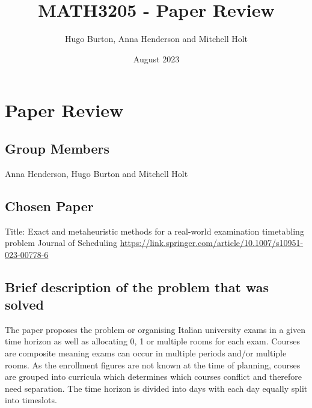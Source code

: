 \documentclass{article}
\title{MATH3205 - Paper Review}
\author{Hugo Burton, Anna Henderson and Mitchell Holt}
\date{August 2023}
\begin{document}
\maketitle

\section{Paper Review}

\subsection{Group Members}
Anna Henderson, Hugo Burton and Mitchell Holt

\subsection{Chosen Paper}
Title: Exact and metaheuristic methods for a real-world examination timetabling problem
Journal of Scheduling
\url{https://link.springer.com/article/10.1007/s10951-023-00778-6}


\subsection{Brief description of the problem that was solved}

The paper proposes the problem or organising Italian university exams in a given time horizon as well as allocating 0, 1 or multiple rooms for each exam. Courses are composite meaning exams can occur in multiple periods and/or multiple rooms. As the enrollment figures are not known at the time of planning, courses are grouped into curricula which determines which courses conflict and therefore need separation. The time horizon is divided into days with each day equally split into timeslots.

\end{document}
